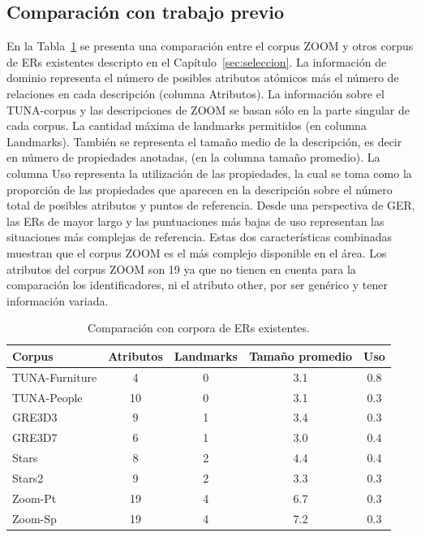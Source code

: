 \subsection{Comparaci\'on con trabajo previo}
\label{sec:comparacion_trabajo_previo}

En la Tabla~\ref{tab-comparison} se presenta una comparaci\'on entre el corpus ZOOM y otros corpus de ERs existentes descripto en el Cap\'itulo~\ref{sec:seleccion}. La informaci\'on de dominio representa el n\'umero de posibles atributos at\'omicos m\'as el n\'umero de relaciones en cada descripci\'on (columna Atributos). La informaci\'on sobre el TUNA-corpus y las descripciones de ZOOM se basan s\'olo en la parte singular de cada corpus. La cantidad m\'axima de landmarks permitidos (en columna Landmarks). Tambi\'en se representa el tama\~no medio de la descripci\'on, es decir en n\'umero de propiedades anotadas, (en la columna tama\~no promedio). La columna Uso representa la utilizaci\'on de las propiedades, la cual se toma como la proporci\'on de las propiedades que aparecen en la descripci\'on sobre el n\'umero total de posibles atributos y puntos de referencia. Desde una perspectiva de GER, las ERs de mayor largo y las puntuaciones m\'as bajas de uso representan las situaciones m\'as complejas de referencia. Estas dos caracter\'isticas combinadas muestran que el corpus ZOOM es el m\'as complejo disponible en el \'area.
Los atributos del corpus ZOOM son 19 ya que no tienen en cuenta para la comparaci\'on los identificadores, ni el atributo other, por ser gen\'erico y tener informaci\'on variada.

\medskip

\begin{table}[h]
\begin{center}
\footnotesize{

\begin{tabular} {  l c c c c}
\hline
Corpus											& Atributos			& Landmarks			& Tama\~{n}o promedio	& Uso \\
\hline
TUNA-Furniture							& 4								& 0							& 3.1				& 0.8   \\
TUNA-People									& 10							& 0							& 3.1				& 0.3   \\
GRE3D3											& 9								& 1							& 3.4				& 0.3   \\
GRE3D7											& 6								& 1							& 3.0				& 0.4   \\
Stars												& 8								& 2							& 4.4				& 0.4   \\
Stars2											& 9								& 2							& 3.3				& 0.3   \\
Zoom-Pt											& 19							& 4							& 6.7				& 0.3   \\
Zoom-Sp											& 19							& 4							& 7.2				& 0.3   \\
\hline
\end{tabular}
}
\end{center}
\caption{Comparaci\'on con corpora de ERs existentes.}
\label{tab-comparison}
\end{table}



